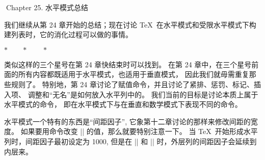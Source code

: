


\beginchapter Chapter 25. 水平模式总结


\1我们继续从第 24 章开始的总结；现在讨论 \TeX\
在水平模式和受限水平模式下构建列表时，它的消化过程可以做的事情。

\ninepoint
\def\\{\smallbreak\textindent{$\bull$}}
\medbreak
\centerline{$*\qquad*\qquad*$}
\medskip\noindent
类似这样的三个星号在第 24 章快结束时可以找到。
在第 24 章中，在三个星号前面的所有内容都既适用于水平模式，也适用于垂直模式，
因此我们就毋需重复那些规则了。
特别地，第 24 章讨论了赋值命令，并且讨论了紧排、惩罚、标记、插入项、
调整和``无名''是如何放入水平列中的。
我们当前的目标是讨论本质上属于水平模式的命令，
即在水平模式下与在垂直和数学模式下表现不同的命令。

水平模式一个特有的东西是``间距因子'', 它象第十二章讨论的那样来修改间距的宽度。%
如果要用命令改变 |\spacefactor| 的值，那么就要特别注意一下。%
当 \TeX\ 开始形成水平列时，间距因子最初设定为 1000,
但是在 |\valign| 和 |\noalign| 时，外层列的间距因子会延续到内层来。

